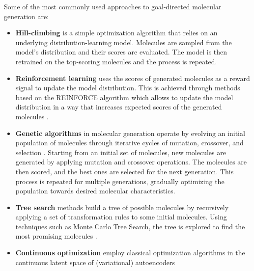 Some of the most commonly used approaches to goal-directed molecular generation are:
\begin{itemize}
      \item \textbf{Hill-climbing}
            \citep{seglerGeneratingFocusedMolecule2018,xieMARSMarkovMolecular2021,thomasAugmentedHillClimbIncreases2022}
            is a simple optimization algorithm that relies on an underlying distribution-learning model.
            Molecules are sampled from the model's distribution and their scores are evaluated.
            The model is then retrained on the top-scoring molecules and the process is repeated.
      \item \textbf{Reinforcement learning} uses the scores of generated molecules as a reward signal to update
            the model distribution. This is achieved through methods based on the REINFORCE algorithm
            \citep{williamsSimpleStatisticalGradientfollowing1992} which allows to update the model
            distribution in a way that increases expected scores of the generated molecules
            \citep{olivecronaMolecularDenovoDesign2017,thomasAugmentedHillClimbIncreases2022,youGraphConvolutionalPolicy2019,guoAugmentedMemoryCapitalizing2023}.
      \item \textbf{Genetic algorithms} in molecular generation operate by evolving an initial
            population of molecules through iterative cycles of mutation, crossover, and selection
            \citep{jensenGraphbasedGeneticAlgorithm2019,nigamGenerativeModelsSuperfast2021,yoshikawaPopulationbasedNovoMolecule2018}.
            Starting from an initial set of molecules, new molecules are generated by applying
            mutation and crossover operations. The molecules are then scored, and the best ones are
            selected for the next generation. This process is repeated for multiple generations,
            gradually optimizing the population towards desired molecular characteristics.
      \item \textbf{Tree search} methods build a tree of possible molecules by recursively applying a set of transformation rules
            to some initial molecules. Using techniques such as Monte Carlo Tree Search, the tree is
            explored to find the most promising molecules \citep{yangChemTSEfficientPython2017,jensenGraphbasedGeneticAlgorithm2019}.
      \item \textbf{Continuous optimization} employ classical optimization algorithms in the continuous
            latent space of (variational) autoencoders
            \citep{gomez-bombarelliAutomaticChemicalDesign2018,kusnerGrammarVariationalAutoencoder2017,winterEfficientMultiobjectiveMolecular2019}

\end{itemize}
